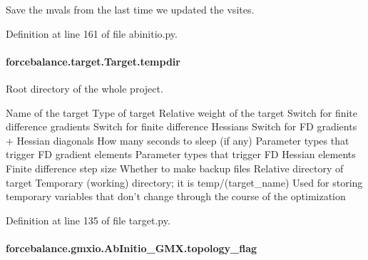 Save the mvals from the last time we updated the vsites. 



Definition at line 161 of file abinitio.\-py.

\hypertarget{classforcebalance_1_1target_1_1Target_aa1f01b5b78db253b5b66384ed11ed193}{
\paragraph[{tempdir}]{\setlength{\rightskip}{0pt plus 5cm}forcebalance.\-target.\-Target.\-tempdir\hspace{0.3cm}{\ttfamily [inherited]}}}\label{classforcebalance_1_1target_1_1Target_aa1f01b5b78db253b5b66384ed11ed193}


Root directory of the whole project. 

Name of the target Type of target Relative weight of the target Switch for finite difference gradients Switch for finite difference Hessians Switch for F\-D gradients + Hessian diagonals How many seconds to sleep (if any) Parameter types that trigger F\-D gradient elements Parameter types that trigger F\-D Hessian elements Finite difference step size Whether to make backup files Relative directory of target Temporary (working) directory; it is temp/(target\-\_\-name) Used for storing temporary variables that don't change through the course of the optimization 

Definition at line 135 of file target.\-py.

\hypertarget{classforcebalance_1_1gmxio_1_1AbInitio__GMX_a4ad28e81af854bc33e671224c5f26fca}{
\paragraph[{topology\-\_\-flag}]{\setlength{\rightskip}{0pt plus 5cm}forcebalance.\-gmxio.\-Ab\-Initio\-\_\-\-G\-M\-X.\-topology\-\_\-flag}}\label{classforcebalance_1_1gmxio_1_1AbInitio__GMX_a4ad28e81af854bc33e671224c5f26fca}


